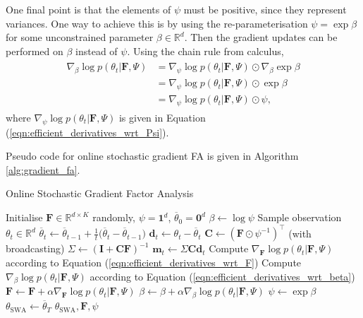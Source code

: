 \documentclass[msc,deptreport.inf]{infthesis} %
\newcommand{\matr}[1]{\mathbf{#1}}
\newcommand{\R}{\mathbb R}
\begin{document}
One final point is that the elements of $\psi$ must be positive, since they represent variances. One way to achieve this is by using the re-parameterisation $\psi = \exp \beta$ for some unconstrained parameter $\beta \in \R^d$. Then the gradient updates can be performed on $\beta$ instead of $\psi$. Using the chain rule from calculus, 
\begin{align}
\begin{split}\label{eqn:efficient_derivatives_wrt_beta}
	\nabla_{\beta} \log p(\theta_t | \matr{F}, \Psi)
	& = \nabla_{\psi} \log p(\theta_t | \matr{F}, \Psi) \odot \nabla_{\beta} \exp \beta \\
	& = \nabla_{\psi} \log p(\theta_t | \matr{F}, \Psi) \odot \exp \beta \\
	& = \nabla_{\psi} \log p(\theta_t | \matr{F}, \Psi) \odot \psi,
\end{split}
\end{align} 
where $\nabla_{\psi} \log p(\theta_t | \matr{F}, \Psi)$ is given in Equation (\ref{eqn:efficient_derivatives_wrt_Psi}).

Pseudo code for online stochastic gradient FA is given in Algorithm \ref{alg:gradient_fa}.

\begin{algorithm}[!htbp] 
	\caption{Online Stochastic Gradient Factor Analysis}
	\label{alg:gradient_fa}
	\begin{algorithmic}[1]
		\State Initialise $\matr{F} \in \R^{d \times K}$ randomly, $\psi = \matr{1}^d$, $\overline{\theta}_0 = \matr{0}^d$
		\State $\beta \leftarrow \log \psi$
			\State Sample observation $\theta_t \in \R^d$
			\State
				$\overline{\theta}_t \leftarrow  \overline{\theta}_{t-1} + \frac{1}{t}\big(\overline{\theta}_t - \overline{\theta}_{t-1}\big)$
			\State $\matr{d}_t \leftarrow \theta_t - \overline{\theta}_t$
			\State $\matr{C} \leftarrow (\matr{F} \odot \psi^{-1})^\intercal$ (with broadcasting)
			\State $\Sigma \leftarrow (\matr{I} + \matr{C} \matr{F})^{-1}$ 
			\State $\matr{m}_t \leftarrow \Sigma \matr{C} \matr{d}_t$ 
			\State Compute $\nabla_{\matr{F}} \log p(\theta_t | \matr{F}, \Psi)$ 
			according to Equation (\ref{eqn:efficient_derivatives_wrt_F})
			\State Compute $\nabla_{\beta} \log p(\theta_t | \matr{F}, \Psi)$ 
			according to Equation (\ref{eqn:efficient_derivatives_wrt_beta})
			\State $\matr{F} \leftarrow \matr{F} + \alpha \nabla_{\matr{F}} \log p(\theta_t | \matr{F}, \Psi)$
			\State $\beta \leftarrow \beta + \alpha \nabla_{\beta} \log p(\theta_t | \matr{F}, \Psi)$
			\State $\psi \leftarrow \exp \beta$
		\EndFor
		\State $\theta_{\text{SWA}} \leftarrow \overline{\theta}_T$
		\State \Return $\theta_{\text{SWA}}, \matr{F}, \psi$
	\end{algorithmic}
\end{algorithm}
\end{document}
